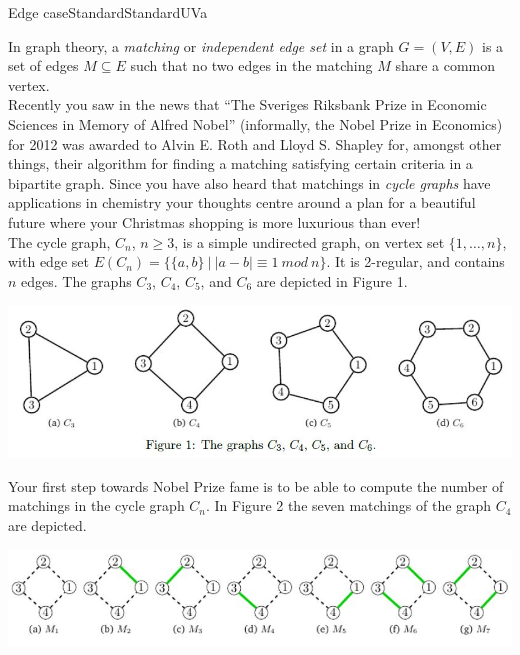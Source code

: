 \begin{problema}{Edge case}{Standard}{Standard}{UVa}

In graph theory, a \emph{matching} or \emph{independent edge set} in a graph $G = (V,E)$ is a set of edges $M \subseteq E$ such that no two edges in the matching $M$ share a common vertex. \\

Recently you saw in the news that ``The Sveriges Riksbank Prize in Economic Sciences in Memory of Alfred Nobel'' (informally, the Nobel Prize in Economics) for 2012 was awarded to Alvin E. Roth and Lloyd S. Shapley for, amongst other things, their algorithm for finding a matching satisfying certain criteria in a bipartite graph. Since you have also heard that matchings in \emph{cycle graphs} have applications in chemistry your thoughts centre around a plan for a beautiful future where your Christmas shopping is more luxurious than ever! \\

The cycle graph, $C_n$, $n \geq 3$, is a simple undirected graph, on vertex set $\{1,\dots,n \}$, with edge set $E(C_n) = \{\{a,b\}\ | \ |a-b| \equiv 1 \ mod \ n \}$. It is 2-regular, and contains $n$ edges. The graphs $C_3$, $C_4$, $C_5$, and $C_6$ are depicted in Figure 1.

\begin{center}
	\includegraphics[width=\textwidth]{graficos/graph1}
\end{center} 

Your first step towards Nobel Prize fame is to be able to compute the number of matchings in the cycle graph $C_n$. In Figure 2 the seven matchings of the graph $C_4$ are depicted.

\begin{center}
	\includegraphics[width=\textwidth]{graficos/graph2}
\end{center} 


\end{problema}
